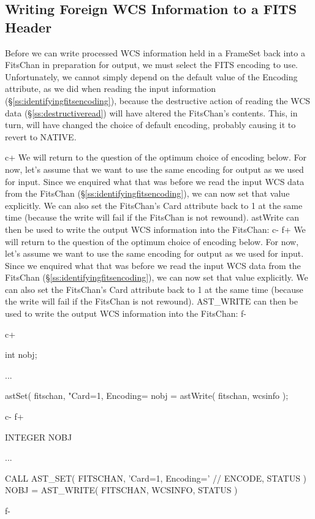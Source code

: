 \documentclass[twoside,11pt]{starlink}
\providecommand{\secref}[1]{\S\ref{#1}}
\begin{document}
\subsection{\label{ss:writingforeignfits}Writing Foreign WCS Information to a FITS Header}

Before we can write processed WCS information held in a FrameSet back
into a FitsChan in preparation for output, we must select the FITS
encoding to use.  Unfortunately, we cannot simply depend on the
default value of the Encoding attribute, as we did when reading the
input information (\secref{ss:identifyingfitsencoding}), because the
destructive action of reading the WCS data
(\secref{ss:destructiveread}) will have altered the FitsChan's
contents. This, in turn, will have changed the choice of default
encoding, probably causing it to revert to NATIVE.

c+
We will return to the question of the optimum choice of encoding
below.  For now, let's assume that we want to use the same encoding
for output as we used for input. Since we enquired what that was
before we read the input WCS data from the FitsChan
(\secref{ss:identifyingfitsencoding}), we can now set that value
explicitly. We can also set the FitsChan's Card attribute back to 1 at
the same time (because the write will fail if the FitsChan is not
rewound). astWrite can then be used to write the output WCS
information into the FitsChan:
c-
f+
We will return to the question of the optimum choice of encoding
below.  For now, let's assume we want to use the same encoding for
output as we used for input. Since we enquired what that was before we
read the input WCS data from the FitsChan
(\secref{ss:identifyingfitsencoding}), we can now set that value
explicitly. We can also set the FitsChan's Card attribute back to 1 at
the same time (because the write will fail if the FitsChan is not
rewound). AST\_WRITE can then be used to write the output WCS
information into the FitsChan:
f-

c+
\small
\begin{terminalv}
int nobj;

...

astSet( fitschan, "Card=1, Encoding=%
nobj = astWrite( fitschan, wcsinfo );
\end{terminalv}
\normalsize
c-
f+
\small
\begin{terminalv}
      INTEGER NOBJ

      ...


      CALL AST_SET( FITSCHAN, 'Card=1, Encoding=' // ENCODE, STATUS )
      NOBJ = AST_WRITE( FITSCHAN, WCSINFO, STATUS )
\end{terminalv}
\normalsize
f-
\end{document}
